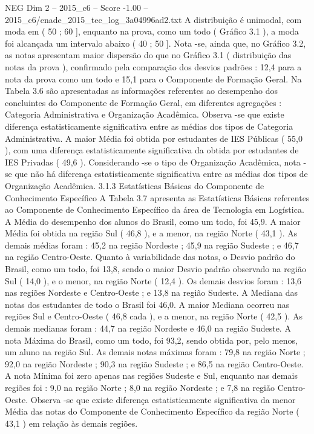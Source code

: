 \begin{textsample}{NEG Dim 2 – 2015\_c6 – Score -1.00 – 2015\_c6/enade\_2015\_tec\_log\_3a04996ad2.txt}
A distribuição é unimodal, com moda em ( 50 ; 60 ], enquanto na prova, como um todo ( Gráfico 3.1 ), a moda foi alcançada um intervalo abaixo ( 40 ; 50 ].
Nota -se, ainda que, no Gráfico 3.2, as notas apresentam maior dispersão do que no Gráfico 3.1 ( distribuição das notas da prova ), confirmado pela comparação dos desvios padrões : 12,4 para a nota da prova como um todo e 15,1 para o Componente de Formação Geral.
Na Tabela 3.6 são apresentadas as informações referentes ao desempenho dos concluintes do Componente de Formação Geral, em diferentes agregações : Categoria Administrativa e Organização Acadêmica.
Observa -se que existe diferença estatisticamente significativa entre as médias dos tipos de Categoria Administrativa.
A maior Média foi obtida por estudantes de IES Públicas ( 55,0 ), com uma diferença estatisticamente significativa da obtida por estudantes de IES Privadas ( 49,6 ).
Considerando -se o tipo de Organização Acadêmica, nota -se que não há diferença estatisticamente significativa entre as médias dos tipos de Organização Acadêmica. 3.1.3 Estatísticas Básicas do Componente de Conhecimento Específico A Tabela 3.7 apresenta as Estatísticas Básicas referentes ao Componente de Conhecimento Específico da área de Tecnologia em Logística.
A Média do desempenho dos alunos do Brasil, como um todo, foi 45,9.
A maior Média foi obtida na região Sul ( 46,8 ), e a menor, na região Norte ( 43,1 ).
As demais médias foram : 45,2 na região Nordeste ; 45,9 na região Sudeste ; e 46,7 na região Centro-Oeste.
Quanto à variabilidade das notas, o Desvio padrão do Brasil, como um todo, foi 13,8, sendo o maior Desvio padrão observado na região Sul ( 14,0 ), e o menor, na região Norte ( 12,4 ).
Os demais desvios foram : 13,6 nas regiões Nordeste e Centro-Oeste ; e 13,8 na região Sudeste.
A Mediana das notas dos estudantes de todo o Brasil foi 46,0.
A maior Mediana ocorreu nas regiões Sul e Centro-Oeste ( 46,8 cada ), e a menor, na região Norte ( 42,5 ).
As demais medianas foram : 44,7 na região Nordeste e 46,0 na região Sudeste.
A nota Máxima do Brasil, como um todo, foi 93,2, sendo obtida por, pelo menos, um aluno na região Sul.
As demais notas máximas foram : 79,8 na região Norte ; 92,0 na região Nordeste ; 90,3 na região Sudeste ; e 86,5 na região Centro-Oeste.
A nota Mínima foi zero apenas nas regiões Sudeste e Sul, enquanto nas demais regiões foi : 9,0 na região Norte ; 8,0 na região Nordeste ; e 7,8 na região Centro-Oeste.
Observa -se que existe diferença estatisticamente significativa da menor Média das notas do Componente de Conhecimento Específico da região Norte ( 43,1 ) em relação às demais regiões.

\end{textsample}
